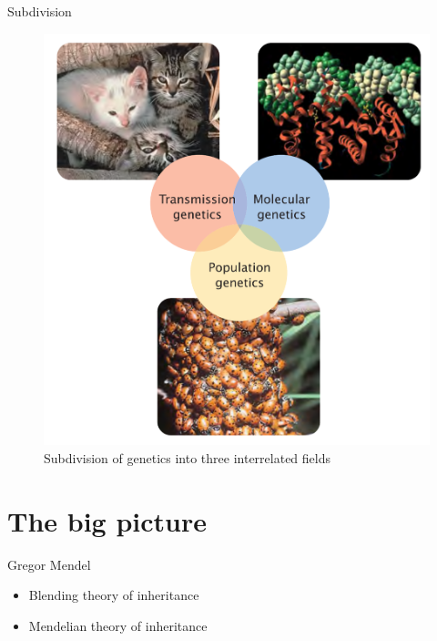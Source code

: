 \documentclass[11pt,ignorenonframetext,aspectratio=169]{beamer}
\providecommand{\tightlist}{%
  \setlength{\itemsep}{0pt}\setlength{\parskip}{0pt}}
\begin{document}
\begin{frame}{Subdivision}
\protect\hypertarget{subdivision}{}
\begin{figure}
\includegraphics[width=0.45\linewidth]{../images/genetics_subdivision} \caption{Subdivision of genetics into three interrelated fields}\label{fig:genetics-subdivision}
\end{figure}
\end{frame}

\hypertarget{the-big-picture}{%
\section{The big picture}\label{the-big-picture}}

\begin{frame}{Gregor Mendel}
\protect\hypertarget{gregor-mendel}{}
\begin{itemize}
\tightlist
\item
  Blending theory of inheritance
\item
  Mendelian theory of inheritance
\end{itemize}
\end{frame}
\end{document}
